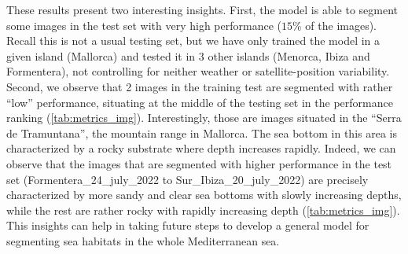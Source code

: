 These results present two interesting insights. First, the model is able to
segment some images in the test set with very high performance ($15\%$ of the
images). Recall this is not a usual testing set, but we have only trained the
model in a given island (Mallorca) and tested it in 3 other islands (Menorca,
Ibiza and Formentera), not controlling for neither weather or
satellite-position variability. Second, we observe that 2 images in the
training test are segmented with rather ``low'' performance, situating at the
middle of the testing set in the performance ranking
(\cref{tab:metrics_img}). Interestingly, those are images situated in the
``Serra de Tramuntana'', the mountain range in Mallorca. The sea bottom in this
area is characterized by a rocky substrate where depth increases rapidly.
Indeed, we can observe that the images that are segmented with higher
performance in the test set (Formentera\_24\_july\_2022 to
Sur\_Ibiza\_20\_july\_2022) are precisely characterized by more sandy and clear
sea bottoms with slowly increasing depths, while the rest are rather rocky with
rapidly increasing depth (\cref{tab:metrics_img}). This insights can help in
taking future steps to develop a general model for segmenting sea habitats in
the whole Mediterranean sea.

